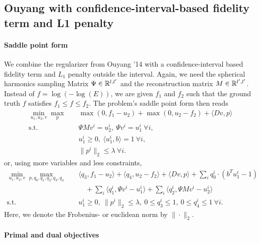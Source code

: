 
\subsection{Ouyang with confidence-interval-based fidelity term and L1 penalty}

\paragraph{Saddle point form}

We combine the regularizer from Ouyang '14 with a confidence-interval based
fidelity term and $L_1$ penalty outside the interval.
Again, we need the spherical harmonics sampling Matrix $\Psi \in \mathbb{R}^{l,l'}$
and the reconstruction matrix $M \in \mathbb{R}^{l',l'}$.
Instead of $f = \log(-\log(E))$, we are given $f_1$ and $f_2$ such that the
ground truth $f$ satisfies $f_1 \leq f \leq f_2$.
The problem's saddle point form then reads
\begin{align*}
    \min_{u_1,u_2,v} \max_{p} \quad
        & \max(0, f_1 - u_2) + \max(0, u_2 - f_2) + \langle Dv, p \rangle \\
    \text{s.t.}\quad 
        & \Psi M v^i = u_2^i, ~\Psi v^i = u_1^i ~\forall i, \\
        & u_1^i \geq 0, ~\langle u_1^i, b \rangle = 1 ~\forall i, \\
        & \|p^{i}\|_{2} \leq \lambda ~\forall i.
\end{align*}
or, using more variables and less constraints,
\begin{align*}
    \min_{u_1,u_2,v} \max_{p,q_0,q_1,q_2,q_3,q_4} \quad
        & \langle q_3, f_1 - u_2 \rangle + \langle q_4, u_2 - f_2 \rangle
            + \langle Dv, p \rangle
            + \sum_{i} q_0^i \cdot (b^T u_1^i - 1) \\
        &\quad + \sum_{i} \langle q_1^i, \Psi v^i - u_1^i \rangle
            + \sum_{i} \langle q_2^i, \Psi M v^i - u_2^i \rangle \\
    \text{s.t.}\quad 
        & u_1^i \geq 0, ~\|p^{i}\|_{2} \leq \lambda,
          ~0 \leq q_3^i \leq 1, ~0 \leq q_4^i \leq 1 ~\forall i.
\end{align*}
Here, we denote the Frobenius- or euclidean norm by $\|\cdot\|_{2}$.

\paragraph{Primal and dual objectives}

